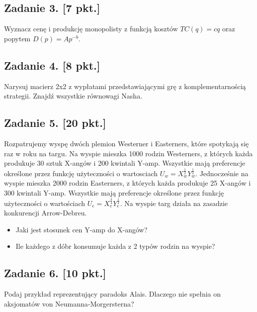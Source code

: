 \documentclass[
]{article}
\begin{document}
\subsection*{Zadanie 3. [7 pkt.]}

Wyznacz cenę i produkcję monopolisty z funkcją kosztów \(TC(q)=cq\) oraz
popytem \(D(p)=Ap^{-b}\).

\subsection*{Zadanie 4. [8 pkt.]}

Narysuj macierz 2x2 z wypłatami przedstawiającymi grę z
komplementarnością strategii. Znajdź wszystkie równowagi Nasha.

\subsection*{Zadanie 5. [20 pkt.]}

Rozpatrujemy wyspę dwóch plemion Westerner i Easterners, które spotykają
się raz w roku na targu. Na wyspie mieszka 1000 rodzin Westerners, z
których każda produkuje 30 sztuk X-angów i 200 kwintali Y-amp. Wszystkie
mają preferencje określone przez funkcję użyteczności o wartosciach
\(U_w=X_w^{\frac{1}{2}}Y_w^{\frac{1}{2}}\). Jednocześnie na wyspie
mieszka 2000 rodzin Easterners, z których każda produkuje 25 X-angów i
300 kwintali Y-amp. Wszystkie mają preferencje określone przez funkcję
użyteczności o wartościach \(U_e=X_e^{\frac{3}{4}} Y_e^{\frac{1}{4}}\).
Na wyspie targ działa na zasadzie konkurencji Arrow-Debreu.

\begin{itemize}
\item Jaki jest stosunek cen Y-amp do X-angów?
\item Ile każdego z dóbr konsumuje każda z 2 typów rodzin na
wyspie?
\end{itemize}

\subsection*{Zadanie 6. [10 pkt.]}

Podaj przykład reprezentujący paradoks Alais. Dlaczego nie spełnia on
aksjomatów von Neumanna-Morgersterna?
\end{document}
